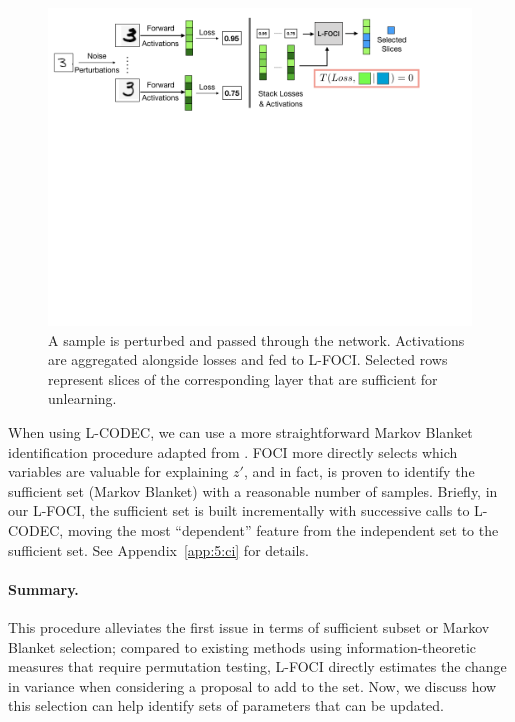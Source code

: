 \begin{figure}
    \centering
    \includegraphics[width=\columnwidth,trim={0 18cm 4cm 0},clip]{5_unlearn/figs/foci_fig_new.png}
    \caption[L-FOCI subset identification pipeline]{A sample is perturbed and passed through the network. Activations are aggregated alongside losses and fed to L-FOCI. Selected rows represent slices of the corresponding layer that are sufficient for unlearning.}
    \label{fig:lfoci}
\end{figure}

When using L-CODEC, we can use a more straightforward Markov Blanket identification procedure adapted from \cite{codec}. FOCI more directly selects which variables are valuable for explaining $z'$, and in fact, is proven to identify the sufficient set (Markov Blanket) with a reasonable number of samples. Briefly, in our L-FOCI, the sufficient set is built incrementally with successive calls to L-CODEC, moving the most ``dependent'' feature from the independent set to the sufficient set.
See Appendix~\ref{app:5:ci} for details.

\paragraph{Summary.} This procedure alleviates the first issue in terms of sufficient subset or Markov Blanket selection; compared to existing methods using information-theoretic measures that require permutation testing, L-FOCI directly estimates the change in variance when considering a proposal to add to the set.
Now, we discuss how this selection can help identify sets of parameters that can be updated.
